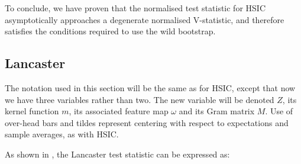 \documentclass[12pt]{article}
\newenvironment{claimproof}[1]{\par\noindent\underline{Proof:}\space#1}{\hfill $\blacksquare$}
\numberwithin{claim}{section}
\numberwithin{lemma}{section}
\numberwithin{theorem}{section}
\begin{document}

To conclude, we have proven that the normalised test statistic for HSIC asymptotically approaches a degenerate normalised V-statistic, and therefore satisfies the conditions required to use the wild bootstrap.


\subsection{Lancaster}

The notation used in this section will be the same as for HSIC, except that now we have three variables rather than two. The new variable will be denoted $Z$, its kernel function $m$, its associated feature map $\omega$ and its Gram matrix $M$. Use of over-head bars and tildes represent centering with respect to expectations and sample averages, as with HSIC. 

As shown in \cite{sejdinovic2013kernel}, the Lancaster test statistic can be expressed as:
\end{document}
